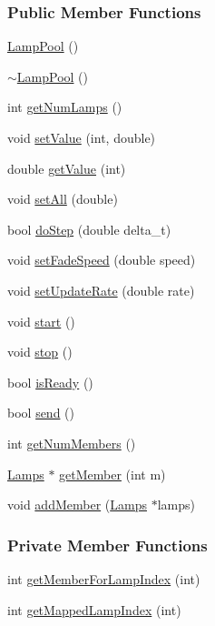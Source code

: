 \subsubsection*{\-Public \-Member \-Functions}
\begin{DoxyCompactItemize}
\item 
\hyperlink{classLampPool_a59801053a3a17434d2575c65dca4002f}{\-Lamp\-Pool} ()
\item 
\hyperlink{classLampPool_ab7ebd17476e0e4405ea2840d37506096}{$\sim$\-Lamp\-Pool} ()
\item 
int \hyperlink{classLampPool_a841fa821a574fce5706529ef342a7801}{get\-Num\-Lamps} ()
\item 
void \hyperlink{classLampPool_a1017c816b9d8690690812c83692cfe49}{set\-Value} (int, double)
\item 
double \hyperlink{classLampPool_acf6877e3883a9804ca1cefab5f6617da}{get\-Value} (int)
\item 
void \hyperlink{classLampPool_a6581aee51439dd08c8217d59a661afa3}{set\-All} (double)
\item 
bool \hyperlink{classLampPool_ab1ac3fbb0bf05504e21a84ed5856703e}{do\-Step} (double delta\-\_\-t)
\item 
void \hyperlink{classLampPool_a2b41e1640e50b736dafe8ceb69fe5bd5}{set\-Fade\-Speed} (double speed)
\item 
void \hyperlink{classLampPool_a0a904aa58951e12a3df7f39cb3c8f857}{set\-Update\-Rate} (double rate)
\item 
void \hyperlink{classLampPool_a93ec860020146d2d8e5779035b3a9b46}{start} ()
\item 
void \hyperlink{classLampPool_a0fd3756c9d927cc1d3dfec08228e1961}{stop} ()
\item 
bool \hyperlink{classLampPool_a6fff0dbb172914a107f4f99563306f49}{is\-Ready} ()
\item 
bool \hyperlink{classLampPool_a9df2536dce2e008da580c36ee69058c0}{send} ()
\item 
int \hyperlink{classLampPool_aec8bc100570e7eab3d59a3759ab0a164}{get\-Num\-Members} ()
\item 
\hyperlink{classLamps}{\-Lamps} $\ast$ \hyperlink{classLampPool_a38f0c6542e733a8e83c88176797e3130}{get\-Member} (int m)
\item 
void \hyperlink{classLampPool_aebf814163555551a356bcfa4730c5507}{add\-Member} (\hyperlink{classLamps}{\-Lamps} $\ast$lamps)
\end{DoxyCompactItemize}
\subsubsection*{\-Private \-Member \-Functions}
\begin{DoxyCompactItemize}
\item 
int \hyperlink{classLampPool_a74d1e9358bba1510873544f29e26ed2d}{get\-Member\-For\-Lamp\-Index} (int)
\item 
int \hyperlink{classLampPool_a63b0f102239f05edb6d8796568fa1bd4}{get\-Mapped\-Lamp\-Index} (int)
\end{DoxyCompactItemize}
